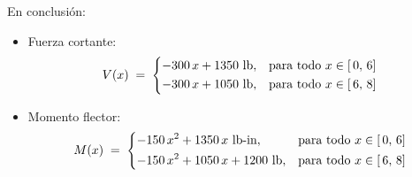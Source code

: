 \documentclass[ a4paper, twoside, 11pt]{article}
\begin{document}
\begin{problem}
En conclusi\'on: 
\begin{itemize}
\item Fuerza cortante: 
\[
V(x) \; = \;
\begin{dcases}
-300 \, x + 1350 \text{ lb} ,
& \text{para todo } x \in [ \, 0, \, 6] \\
-300 \, x + 1050 \text{ lb} ,
& \text{para todo } x \in [ \, 6, \, 8] \\
\end{dcases}
\]
\item Momento flector: 
\[
M(x) \; = \;
\begin{dcases}
- 150 \, x^2 + 1350 \, x \text{ lb-in} ,
& \text{para todo } x \in [ \, 0, \, 6] \\
- 150 \, x^2 + 1050 \, x + 1200 \text{ lb} ,
& \text{para todo } x \in [ \, 6, \, 8] \\
\end{dcases}
\]
\end{itemize}

\end{problem}
\fullskip
\end{document}
